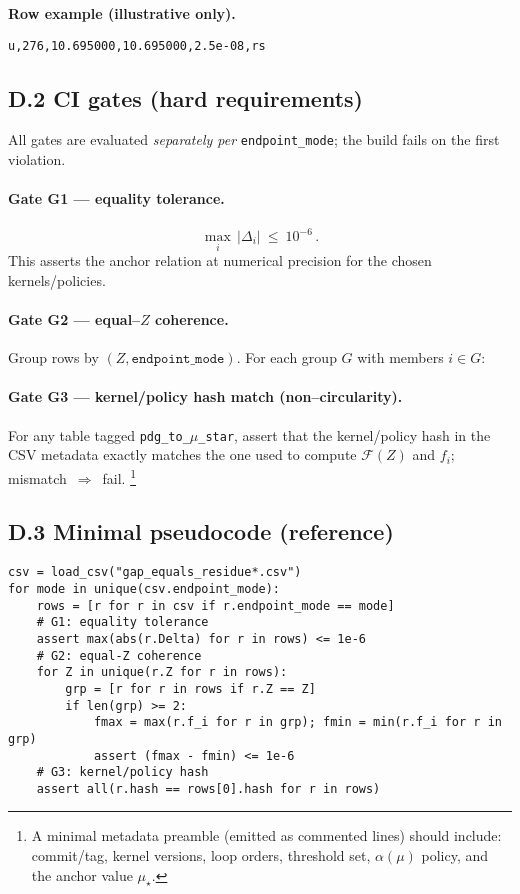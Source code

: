 \documentclass[epjc3]{svjour3}
\begin{document}
\noindent\textbf{Row example (illustrative only).}
\begin{verbatim}
u,276,10.695000,10.695000,2.5e-08,rs
\end{verbatim}

\subsection*{D.2 CI gates (hard requirements)}
All gates are evaluated \emph{separately per} \texttt{endpoint\_mode}; the build fails on the first violation.

\paragraph{Gate G1 — equality tolerance.}
\[
\max_{i}\,|\Delta_i|\ \le\ 10^{-6}\,.
\]
This asserts the anchor relation at numerical precision for the chosen kernels/policies.

\paragraph{Gate G2 — equal–\(Z\) coherence.}
Group rows by \((Z,\texttt{endpoint\_mode})\). For each group \(G\) with members \(i\in G\):

\iffalse
\[
\operatorname{range}\bigl(\{f_i\}_{i\in G}\bigr)
\ \equiv\
\max_{i\in G} f_i-\min_{i\in G} f_i
\ \le\ 10^{-6}\,.
\]
This enforces that equal–\(Z\) families (e.g.\ \(u,c,t\)) land coherently at the anchor under identical policies.
\fi

\paragraph{Gate G3 — kernel/policy hash match (non–circularity).}
For any table tagged \texttt{pdg\_to\_\(\mu\)\_star}, assert that the kernel/policy hash in the CSV
metadata exactly matches the one used to compute \(\mathcal F(Z)\) and \(f_i\); mismatch~\(\Rightarrow\)~fail.%
\footnote{A minimal metadata preamble (emitted as commented lines) should include: commit/tag, kernel versions, loop orders, threshold set, \(\alpha(\mu)\) policy, and the anchor value \(\mu_\star\).}

\subsection*{D.3 Minimal pseudocode (reference)}
\begin{verbatim}
csv = load_csv("gap_equals_residue*.csv")
for mode in unique(csv.endpoint_mode):
    rows = [r for r in csv if r.endpoint_mode == mode]
    # G1: equality tolerance
    assert max(abs(r.Delta) for r in rows) <= 1e-6
    # G2: equal-Z coherence
    for Z in unique(r.Z for r in rows):
        grp = [r for r in rows if r.Z == Z]
        if len(grp) >= 2:
            fmax = max(r.f_i for r in grp); fmin = min(r.f_i for r in grp)
            assert (fmax - fmin) <= 1e-6
    # G3: kernel/policy hash
    assert all(r.hash == rows[0].hash for r in rows)
\end{verbatim}
\end{document}
